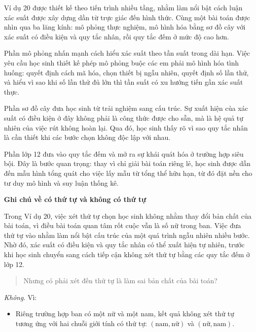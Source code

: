   {
    Ví dụ 20 được thiết kế theo tiến trình nhiều tầng, nhằm làm nổi bật cách luận xác suất được xây dựng dần từ trực giác đến hình thức. Cùng một bài toán được nhìn qua ba lăng kính: mô phỏng thực nghiệm, mô hình hóa bằng sơ đồ cây với xác suất có điều kiện và quy tắc nhân, rồi quy tắc đếm ở mức độ cao hơn.

    Phần mô phỏng nhấn mạnh cách hiểu xác suất theo tần suất trong dài hạn. Việc yêu cầu học sinh thiết kế phép mô phỏng buộc các em phải mô hình hóa tình huống: quyết định cách mã hóa, chọn thiết bị ngẫu nhiên, quyết định số lần thử, và hiểu vì sao khi số lần thử đủ lớn thì tần suất có xu hướng tiến gần xác suất thực.

    Phần sơ đồ cây đưa học sinh từ trải nghiệm sang cấu trúc. Sự xuất hiện của xác suất có điều kiện ở đây không phải là công thức được cho sẵn, mà là hệ quả tự nhiên của việc rút không hoàn lại. Qua đó, học sinh thấy rõ vì sao quy tắc nhân là cần thiết khi các bước chọn không độc lập với nhau.

    Phần lớp 12 đưa vào quy tắc đếm và mở ra sự khái quát hóa ở trường hợp siêu bội. Đây là bước quan trọng: thay vì chỉ giải bài toán riêng lẻ, học sinh được dẫn đến mẫu hình tổng quát cho việc lấy mẫu từ tổng thể hữu hạn, từ đó đặt nền cho tư duy mô hình và suy luận thống kê.\vspace{\baselineskip}

    \noindent
    \textbf{Ghi chú về có thứ tự và không có thứ tự}\vspace{\baselineskip}

    Trong Ví dụ 20, việc xét thứ tự chọn học sinh không nhằm thay đổi bản chất của bài toán, vì điều bài toán quan tâm rốt cuộc vẫn là số nữ trong ban. Việc đưa thứ tự vào nhằm làm nổi bật cấu trúc của một quá trình ngẫu nhiên nhiều bước. Nhờ đó, xác suất có điều kiện và quy tắc nhân có thể xuất hiện tự nhiên, trước khi học sinh chuyển sang cách tiếp cận không xét thứ tự bằng các quy tắc đếm ở lớp 12.

    \begin{quote}
      Nhưng có phải xét đến thứ tự là làm sai bản chất của bài toán?
    \end{quote}

    \vspace{0.3\baselineskip}
    \noindent
    \emph{Không}. Vì:

    \begin{itemize}
      \item Riêng trường hợp ban có một nữ và một nam, kết quả không xét thứ tự tương ứng với hai chuỗi giới tính có thứ tự: $(\text{nam}, \text{nữ})$ và $(\text{nữ}, \text{nam})$.
      

\end{itemize}}
